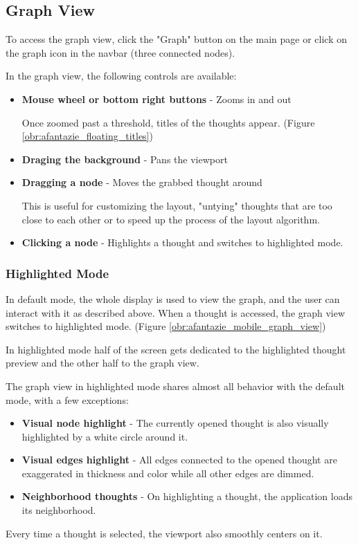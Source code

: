 \subsection{Graph View}
To access the graph view, click the "Graph" button on the main page
or click on the graph icon in the navbar (three connected nodes).

In the graph view, the following controls are available:
\begin{itemize}
  \item \textbf{Mouse wheel or bottom right buttons} - Zooms in and out

 Once zoomed past a threshold, titles of the thoughts appear. (Figure \ref{obr:afantazie_floating_titles})
  \item \textbf{Draging the background} - Pans the viewport
  \item \textbf{Dragging a node} - Moves the grabbed thought around
  
 This is useful for customizing the layout, "untying" thoughts that are too close to each other or to speed up the process of the layout algorithm. 
  \item \textbf{Clicking a node} - Highlights a thought and switches to highlighted mode.
\end{itemize}

\subsubsection*{Highlighted Mode}

In default mode, the whole display is used to view the graph, and the user can interact with it as described above.
When a thought is accessed, the graph view switches to highlighted mode. (Figure \ref{obr:afantazie_mobile_graph_view})

In highlighted mode half of the screen gets dedicated to the highlighted thought preview and the other half to the graph view.

The graph view in highlighted mode shares almost all behavior with the default mode, with a few exceptions:
\begin{itemize}
  \item \textbf{Visual node highlight} - The currently opened thought is also visually highlighted by a white circle around it.
  \item \textbf{Visual edges highlight} - All edges connected to the opened thought are exaggerated in thickness and color while all other edges are dimmed.
  \item \textbf{Neighborhood thoughts} - On highlighting a thought, the application loads its neighborhood.
\end{itemize}
Every time a thought is selected, the viewport also smoothly centers on it.

